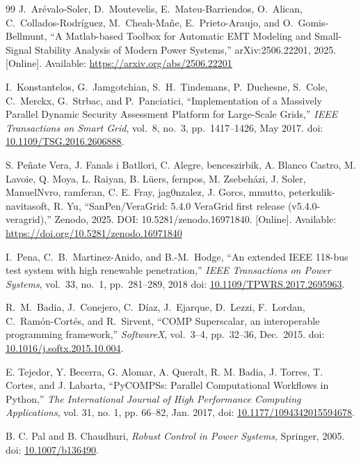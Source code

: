 \documentclass[journal]{IEEEtran}
\begin{document}
\begin{thebibliography}{99}
J.~Arévalo-Soler, D.~Moutevelis, E.~Mateu-Barriendos, O.~Alican,
C.~Collados-Rodr\'iguez, M.~Cheah-Ma\~ne, E.~Prieto-Araujo, and O.~Gomis-Bellmunt,
``A Matlab-based Toolbox for Automatic EMT Modeling and Small-Signal Stability Analysis of Modern Power Systems,''
arXiv:2506.22201, 2025.
[Online]. Available: \url{https://arxiv.org/abs/2506.22201}

I.~Konstantelos, G.~Jamgotchian, S.~H.~Tindemans, P.~Duchesne, S.~Cole, C.~Merckx, G.~Strbac, and P.~Panciatici,
``Implementation of a Massively Parallel Dynamic Security Assessment Platform for Large-Scale Grids,''
\emph{IEEE Transactions on Smart Grid}, vol.~8, no.~3, pp.~1417--1426, May 2017.
doi: \href{https://doi.org/10.1109/TSG.2016.2606888} {10.1109/TSG.2016.2606888}.

S. Peñate Vera, J. Fanals i Batllori, C. Alegre, benceszirbik, A. Blanco Castro, 
M. Lavoie, Q. Moya, L. Raiyan, B. Lüers, fernpos, M. Zsebeházi, J. Soler, 
ManuelNvro, ramferan, C. E. Fray, jag0nzalez, J. Gorcs, mmutto, 
peterkulik-navitasoft, R. Yu, 
``SanPen/VeraGrid: 5.4.0 VeraGrid first release (v5.4.0-veragrid),'' Zenodo, 2025. 
DOI: 10.5281/zenodo.16971840. [Online]. Available: \url{https://doi.org/10.5281/zenodo.16971840}

I.~Pena, C.~B.~Martinez-Anido, and B.-M.~Hodge,
``An extended IEEE 118-bus test system with high renewable penetration,''
\emph{IEEE Transactions on Power Systems}, vol.~33, no.~1, pp.~281--289, 2018
doi: \href{https://doi.org/10.1109/TPWRS.2017.2695963}{10.1109/TPWRS.2017.2695963}.

R.~M.~Badia, J.~Conejero, C.~Díaz, J.~Ejarque, D.~Lezzi, F.~Lordan,
C.~Ramón-Cortés, and R.~Sirvent,
``COMP Superscalar, an interoperable programming framework,''
\emph{SoftwareX}, vol.~3--4, pp.~32--36, Dec.~2015.
doi: \href{https://doi.org/10.1016/j.softx.2015.10.004} {10.1016/j.softx.2015.10.004}.

E. Tejedor, Y. Becerra, G. Alomar, A. Queralt, R. M. Badia, J. Torres, T. Cortes, and J. Labarta,
“PyCOMPSs: Parallel Computational Workflows in Python,”
\textit{The International Journal of High Performance Computing Applications},
vol. 31, no. 1, pp. 66--82,
Jan. 2017,
doi: \href{https://doi.org/10.1177/1094342015594678}{10.1177/1094342015594678}.

B. C. Pal and B. Chaudhuri, \emph{Robust Control in Power Systems}, Springer, 2005.
doi: \href{https://doi.org/10.1007/b136490}{10.1007/b136490}.


\end{thebibliography}
\end{document}
